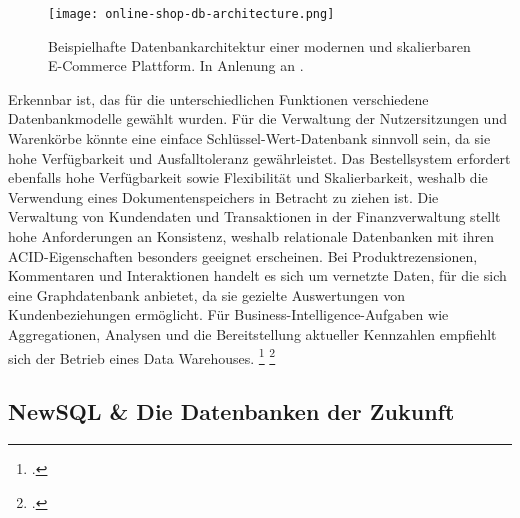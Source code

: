 \begin{figure}[H]
    \centering
    \texttt{[image: online-shop-db-architecture.png]}
    \caption{Beispielhafte Datenbankarchitektur einer modernen und skalierbaren E-Commerce Plattform. In Anlenung an \cite{donofrioBigDataAnalytics2021}.}
    \label{fig:online-shop-architecture}
\end{figure}

Erkennbar ist, das für die unterschiedlichen Funktionen verschiedene Datenbankmodelle gewählt wurden. Für die Verwaltung der Nutzersitzungen und Warenkörbe könnte eine einface Schlüssel-Wert-Datenbank sinnvoll sein, da sie hohe Verfügbarkeit und Ausfalltoleranz gewährleistet. Das Bestellsystem erfordert ebenfalls hohe Verfügbarkeit sowie Flexibilität und Skalierbarkeit, weshalb die Verwendung eines Dokumentenspeichers in Betracht zu ziehen ist. Die Verwaltung von Kundendaten und Transaktionen in der Finanzverwaltung stellt hohe Anforderungen an Konsistenz, weshalb relationale Datenbanken mit ihren ACID-Eigenschaften besonders geeignet erscheinen. Bei Produktrezensionen, Kommentaren und Interaktionen handelt es sich um vernetzte Daten, für die sich eine Graphdatenbank anbietet, da sie gezielte Auswertungen von Kundenbeziehungen ermöglicht. Für Business-Intelligence-Aufgaben wie Aggregationen, Analysen und die Bereitstellung aktueller Kennzahlen empfiehlt sich der Betrieb eines Data Warehouses. \footcite[S. 8]{donofrioBigDataAnalytics2021} \vspace{0.1cm} \footcite[S. 47]{meierWerkzeugeDigitalenWirtschaft2018}



\subsection{NewSQL \& Die Datenbanken der Zukunft}

